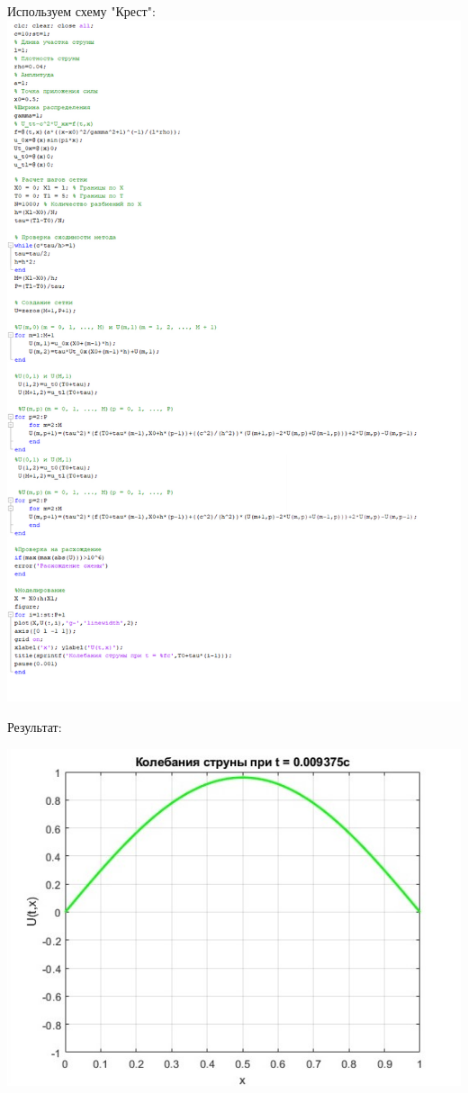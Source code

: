 \documentclass[a4paper]{article}
\begin{document}
\newpage

Используем схему "Крест": \\

\includegraphics[width=15cm]{img/3.jpg}

\newpage

Результат:

\includegraphics{img/1_1.jpg}
\end{document}
